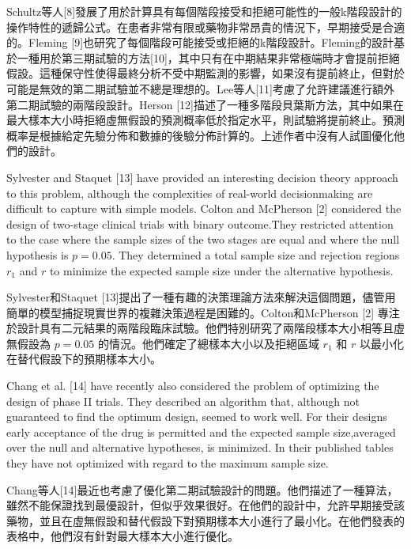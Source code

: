 	Schultz等人[8]發展了用於計算具有每個階段接受和拒絕可能性的一般k階段設計的操作特性的遞歸公式。在患者非常有限或藥物非常昂貴的情況下，早期接受是合適的。Fleming [9]也研究了每個階段可能接受或拒絕的k階段設計。Fleming的設計基於一種用於第三期試驗的方法[10]，其中只有在中期結果非常極端時才會提前拒絕假設。這種保守性使得最終分析不受中期監測的影響，如果沒有提前終止，但對於可能是無效的第二期試驗並不總是理想的。Lee等人[11]考慮了允許建議進行額外第二期試驗的兩階段設計。Herson [12]描述了一種多階段貝葉斯方法，其中如果在最大樣本大小時拒絕虛無假設的預測概率低於指定水平，則試驗將提前終止。預測概率是根據給定先驗分佈和數據的後驗分佈計算的。上述作者中沒有人試圖優化他們的設計。

	Sylvester and Staquet [13] have provided an interesting decision theory approach to this problem, although the complexities of real-world decisionmaking are difficult to capture with simple models. Colton and McPherson [2] considered the design of two-stage clinical trials with binary outcome.They restricted attention to the case where the sample sizes of the two stages are equal and where the null hypothesis is $p=0.05$. They determined a total sample size and rejection regions $r_1$ and $r$ to minimize the expected sample size under the alternative hypothesis. 

	Sylvester和Staquet [13]提出了一種有趣的決策理論方法來解決這個問題，儘管用簡單的模型捕捉現實世界的複雜決策過程是困難的。Colton和McPherson [2] 專注於設計具有二元結果的兩階段臨床試驗。他們特別研究了兩階段樣本大小相等且虛無假設為 $p=0.05$ 的情況。他們確定了總樣本大小以及拒絕區域 $r_1$ 和 $r$ 以最小化在替代假設下的預期樣本大小。

	Chang et al. [14] have recently also considered the problem of optimizing the design of phase II trials. They described an algorithm that, although not guaranteed to find the optimum design, seemed to work well. For their designs early acceptance of the drug is permitted and the expected sample size,averaged over the null and alternative hypotheses, is minimized. In their published tables they have not optimized with regard to the maximum sample size. 

	Chang等人[14]最近也考慮了優化第二期試驗設計的問題。他們描述了一種算法，雖然不能保證找到最優設計，但似乎效果很好。在他們的設計中，允許早期接受該藥物，並且在虛無假設和替代假設下對預期樣本大小進行了最小化。在他們發表的表格中，他們沒有針對最大樣本大小進行優化。

